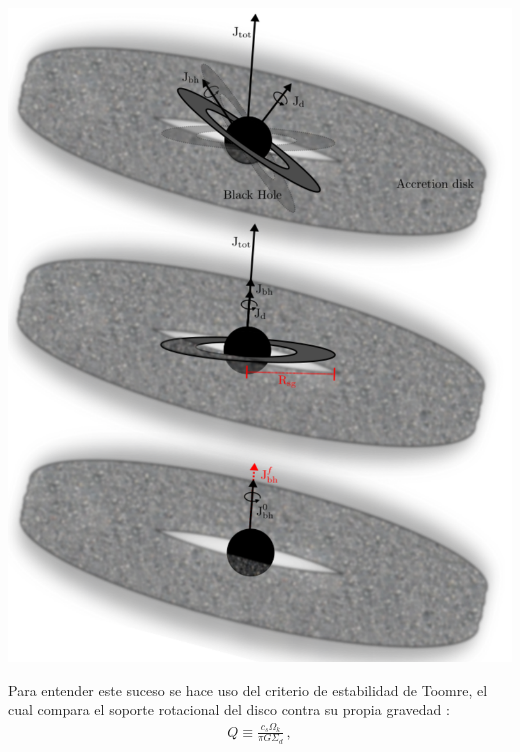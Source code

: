 \begin{center}
\includegraphics[scale=.3]{./figures/4_Modelo_Spin/Sistema_auto-gravitante.png}
\label{fig: Sistema auto-gravitante}
\end{center}
%
Para entender este suceso se hace uso del criterio de estabilidad de Toomre, el cual compara el soporte rotacional del disco contra su propia gravedad \cite{Bustamante2018b}:
%
\begin{align}
    Q\equiv\frac{c_{s}\Omega_{k}}{\pi G\Sigma_{d}}\,,
    \label{eq: estabilidad_Toomre's}
\end{align}

